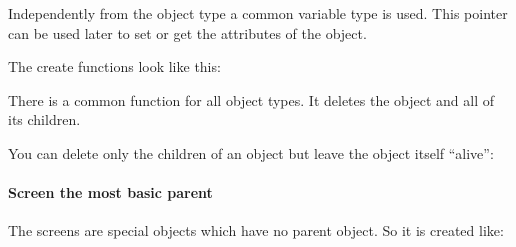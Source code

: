 \documentclass[letterpaper,10pt,english]{sphinxmanual}
\begin{document}
Independently from the object type a common variable type  is used. This pointer can be used later to set or get the attributes of the object.

The create functions look like this:

\begin{sphinxVerbatim}[commandchars=\\\{\}]
        
\end{sphinxVerbatim}

There is a common  function for all object types. It deletes the object and all of its children.

\begin{sphinxVerbatim}[commandchars=\\\{\}]
   
\end{sphinxVerbatim}

You can delete only the children of an object but leave the object itself “alive”:

\begin{sphinxVerbatim}[commandchars=\\\{\}]
   
\end{sphinxVerbatim}


\paragraph{Screen \textendash{} the most basic parent}
\label{\detokenize{overview/objects:screen-the-most-basic-parent}}
The screens are special objects which have no parent object. So it is created like:

\begin{sphinxVerbatim}[commandchars=\\\{\}]
     
\end{sphinxVerbatim}
\end{document}

